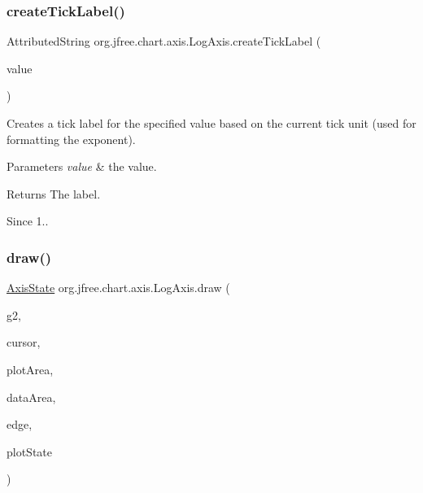 \subsubsection{\texorpdfstring{create\+Tick\+Label()}{createTickLabel()}}
{\footnotesize\ttfamily Attributed\+String org.\+jfree.\+chart.\+axis.\+Log\+Axis.\+create\+Tick\+Label (\begin{DoxyParamCaption}\item[{double}]{value }\end{DoxyParamCaption})\hspace{0.3cm}{\ttfamily [protected]}}

Creates a tick label for the specified value based on the current tick unit (used for formatting the exponent).


\begin{DoxyParams}{Parameters}
{\em value} & the value.\\
\hline
\end{DoxyParams}
\begin{DoxyReturn}{Returns}
The label.
\end{DoxyReturn}
\begin{DoxySince}{Since}
1.. 
\end{DoxySince}
\mbox{\label{classorg_1_1jfree_1_1chart_1_1axis_1_1_log_axis_afa316f42cc412b316e63a953c8e85a77}} 
\subsubsection{\texorpdfstring{draw()}{draw()}}
{\footnotesize\ttfamily \mbox{\hyperlink{classorg_1_1jfree_1_1chart_1_1axis_1_1_axis_state}{Axis\+State}} org.\+jfree.\+chart.\+axis.\+Log\+Axis.\+draw (\begin{DoxyParamCaption}\item[{Graphics2D}]{g2,  }\item[{double}]{cursor,  }\item[{Rectangle2D}]{plot\+Area,  }\item[{Rectangle2D}]{data\+Area,  }\item[{Rectangle\+Edge}]{edge,  }\item[{\mbox{\hyperlink{classorg_1_1jfree_1_1chart_1_1plot_1_1_plot_rendering_info}{Plot\+Rendering\+Info}}}]{plot\+State }\end{DoxyParamCaption})}

